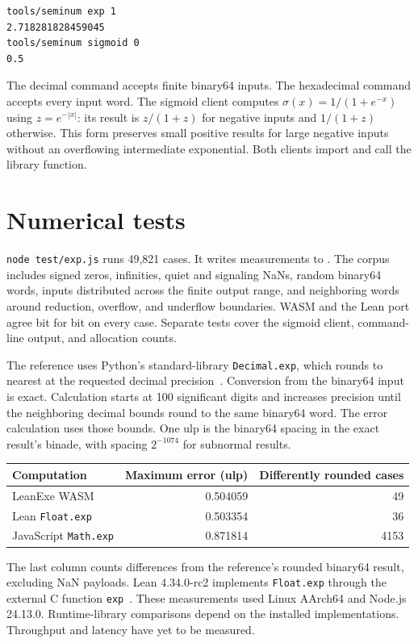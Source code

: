 \begin{lstlisting}
tools/seminum exp 1
2.718281828459045
tools/seminum sigmoid 0
0.5
\end{lstlisting}

The decimal command accepts finite binary64 inputs.  The hexadecimal command
accepts every input word.  The sigmoid client computes
$\sigma(x)=1/(1+e^{-x})$ using $z=e^{-|x|}$: its result is $z/(1+z)$ for
negative inputs and $1/(1+z)$ otherwise.  This form preserves small positive
results for large negative inputs without an overflowing intermediate
exponential.  Both clients import and call the library function.

\newpage
\section{Numerical tests}
\texttt{node test/exp.js} runs 49,821 cases.  It writes measurements to
.  The corpus includes signed zeros,
infinities, quiet and signaling NaNs, random binary64 words, inputs distributed
across the finite output range, and neighboring words around reduction,
overflow, and underflow boundaries.  WASM and the Lean port agree bit for bit
on every case.  Separate tests cover the sigmoid client, command-line output,
and allocation counts.

The reference uses Python's standard-library \texttt{Decimal.exp}, which
rounds to nearest at the requested decimal precision~\cite{decimal}.
Conversion from the binary64 input is exact.  Calculation starts at 100
significant digits and increases precision until the neighboring decimal
bounds round to the same binary64 word.  The error calculation uses those
bounds.  One ulp is the binary64 spacing in the exact result's binade, with
spacing $2^{-1074}$ for subnormal results.

\begin{center}
\begin{tabular}{lrr}
\hline
Computation & Maximum error (ulp) & Differently rounded cases\\
\hline
LeanExe WASM & 0.504059 & 49\\
Lean \texttt{Float.exp} & 0.503354 & 36\\
JavaScript \texttt{Math.exp} & 0.871814 & 4153\\
\hline
\end{tabular}
\end{center}
The last column counts differences from the reference's rounded binary64
result, excluding NaN payloads.  Lean 4.34.0-rc2 implements
\texttt{Float.exp} through the external C function \texttt{exp}~\cite{lean}.
These measurements used Linux AArch64 and Node.js 24.13.0.  Runtime-library
comparisons depend on the installed implementations.  Throughput and latency
have yet to be measured.

